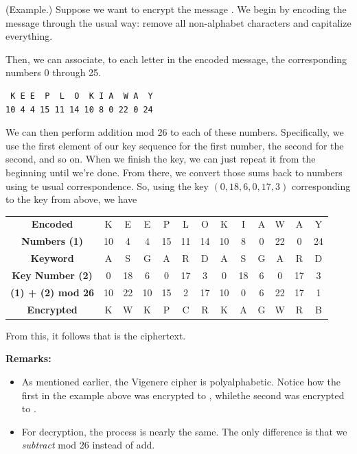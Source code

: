 \documentclass[letterpaper]{article}
\newcommand{\0}{\mathbf{0}}
\begin{document}
\begin{mdframed}
    (Example.) Suppose we want to encrypt the message . We begin by encoding the message through the usual way: remove all non-alphabet characters and capitalize everything. 
    \begin{mdframed}
    \end{mdframed}
    Then, we can associate, to each letter in the encoded message, the corresponding numbers 0 through 25.
    \begin{mdframed}
\begin{verbatim}
 K E E  P  L  O  K I A  W A  Y
10 4 4 15 11 14 10 8 0 22 0 24\end{verbatim}
    \end{mdframed}
    We can then perform addition mod 26 to each of these numbers. Specifically, we use the first element of our key sequence for the first number, the second for the second, and so on. When we finish the key, we can just repeat it from the beginning until we're done. From there, we convert those sums back to numbers using te usual correspondence. So, using the key $(0, 18, 6, 0, 17, 3)$ corresponding to the key  from above, we have 
    \begin{center}
        \begin{tabular}{c|c c c c c c c c c c c c}
            \textbf{Encoded} & K & E & E & P & L & O & K & I & A & W & A & Y \\ 
            \textbf{Numbers (1)} & 10 & 4 & 4 & 15 & 11 & 14 & 10 & 8 & 0 & 22 & 0 & 24 \\ 
            \textbf{Keyword} & A & S & G & A & R & D & A & S & G & A & R & D \\ 
            \textbf{Key Number (2)} & 0 & 18 & 6 & 0 & 17 & 3 & 0 & 18 & 6 & 0 & 17 & 3 \\ 
            \textbf{(1) + (2) mod 26} & 10 & 22 & 10 & 15 & 2 & 17 & 10 & 0 & 6 & 22 & 17 & 1 \\ 
            \textbf{Encrypted} & K & W & K & P & C & R & K & A & G & W & R & B
        \end{tabular}
    \end{center}
    From this, it follows that  is the ciphertext.
\end{mdframed}
\textbf{Remarks:}
\begin{itemize}
    \item As mentioned earlier, the Vigenere cipher is polyalphabetic. Notice how the first  in the example above was encrypted to , whilethe second  was encrypted to . 
    \item For decryption, the process is nearly the same. The only difference is that we \emph{subtract} mod 26 instead of add. 
\end{itemize} 
\end{document}
